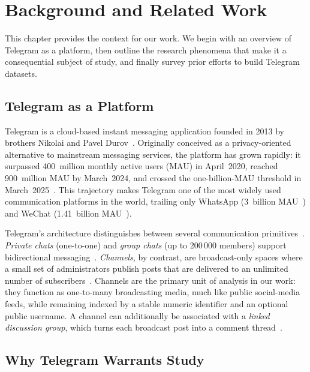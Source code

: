 \chapter{Background and Related Work}
\label{chap:background}

This chapter provides the context for our work. We begin with an overview of Telegram as a platform, then outline the research phenomena that make it a consequential subject of study, and finally survey prior efforts to build Telegram datasets.

\section{Telegram as a Platform}
\label{sec:telegram-platform}

Telegram is a cloud-based instant messaging application founded in 2013 by brothers Nikolai and Pavel Durov~\cite{telegram2026}.
Originally conceived as a privacy-oriented alternative to mainstream messaging services, the platform has grown rapidly: it surpassed 400~million monthly active users (MAU) in April~2020, reached 900~million MAU by March~2024, and crossed the one-billion-MAU threshold in March~2025~\cite{telegramstats2025}.
This trajectory makes Telegram one of the most widely used communication platforms in the world, trailing only WhatsApp (3~billion MAU~\cite{whatsapp2025}) and WeChat (1.41~billion MAU~\cite{wechat2025}).

Telegram's architecture distinguishes between several communication primitives~\cite{telegramfaq}.
\emph{Private chats} (one-to-one) and \emph{group chats} (up to 200\,000 members) support bidirectional messaging~\cite{telegramfaq}.
\emph{Channels}, by contrast, are broadcast-only spaces where a small set of administrators publish posts that are delivered to an unlimited number of subscribers~\cite{telegramchannels}.
Channels are the primary unit of analysis in our work: they function as one-to-many broadcasting media, much like public social-media feeds, while remaining indexed by a stable numeric identifier and an optional public username.
A channel can additionally be associated with a \emph{linked discussion group}, which turns each broadcast post into a comment thread~\cite{telegramdiscussion}.

\section{Why Telegram Warrants Study}
\label{sec:why-telegram}


